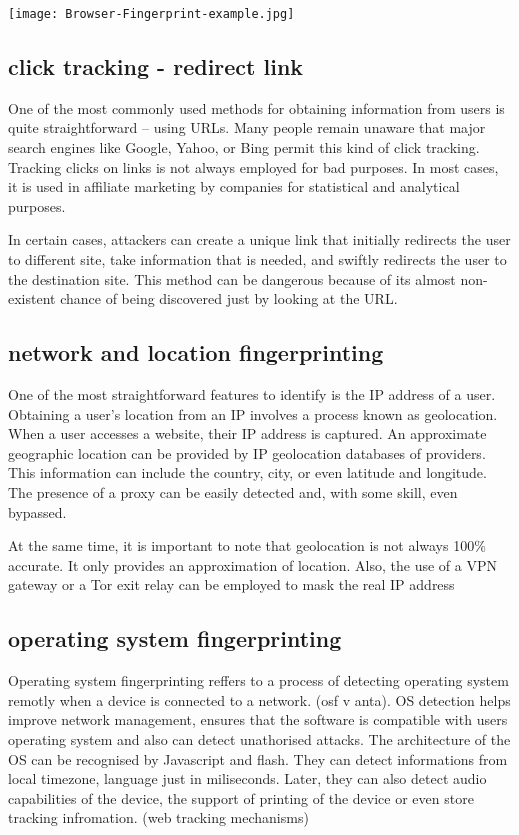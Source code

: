 \documentclass[10pt,a4paper,column]{article}
\begin{document}
\begin{center}
\texttt{[image: Browser-Fingerprint-example.jpg]}
\end{center}
\subsection{click tracking - redirect link} 
One of the most commonly used methods for obtaining information from users is quite straightforward – using URLs. Many people remain unaware that major search engines like Google, Yahoo, or Bing permit this kind of click tracking. Tracking clicks on links is not always employed for bad purposes. In most cases, it is used in affiliate marketing by companies for statistical and analytical purposes. 

In certain cases, attackers can create a unique link that initially redirects the user to different site, take information that is needed, and swiftly redirects the user to the destination site. This method can be dangerous because of its almost non-existent chance of being discovered just by looking at the URL. 
\subsection{network and location fingerprinting}
One of the most straightforward features to identify is the IP address of a user. Obtaining a user's location from an IP involves a process known as geolocation. When a user accesses a website, their IP address is captured. An approximate geographic location can be provided by IP geolocation databases of providers. This information can include the country, city, or even latitude and longitude. The presence of a proxy can be easily detected and, with some skill, even bypassed.

At the same time, it is important to note that geolocation is not always 100\% accurate. It only provides an approximation of location. Also, the use of a VPN gateway or a Tor exit relay can be employed to mask the real IP address

\subsection{operating system fingerprinting}
Operating system fingerprinting reffers to a process of detecting operating system remotly when a device is connected to a network. (osf v anta). OS detection helps improve network management, ensures that the software is compatible with users operating system and also can detect unathorised attacks. The architecture of the OS can be recognised by Javascript and flash. They can detect informations from local timezone, language just in miliseconds. Later, they can also detect audio capabilities of the device, the support of printing of the device or even store tracking infromation. (web tracking mechanisms)
\end{document}
